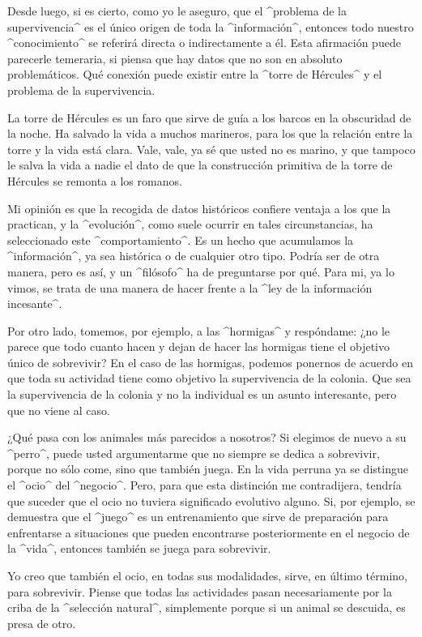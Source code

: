 Desde luego, si es cierto, como yo le aseguro, que el ^problema de la
supervivencia^ es el único origen de toda la ^información^, entonces
todo nuestro ^conocimiento^ se referirá directa o indirectamente a él.
Esta afirmación puede parecerle temeraria, si piensa que hay datos que
no son en absoluto problemáticos. Qué conexión puede existir entre la
^torre de Hércules^ y el problema de la supervivencia.

La torre de Hércules es un faro que sirve de guía a los barcos en la
obscuridad de la noche. Ha salvado la vida a muchos marineros, para los
que la relación entre la torre y la vida está clara. Vale, vale, ya sé
que usted no es marino, y que tampoco le salva la vida a nadie el dato
de que la construcción primitiva de la torre de Hércules se remonta a
los romanos.

Mi opinión es que la recogida de datos históricos confiere ventaja a los
que la practican, y la ^evolución^, como suele ocurrir en tales
circunstancias, ha seleccionado este ^comportamiento^. Es un hecho que
acumulamos la ^información^, ya sea histórica o de cualquier otro tipo.
Podría ser de otra manera, pero es así, y un ^filósofo^ ha de
preguntarse por qué. Para mi, ya lo vimos, se trata de una manera de
hacer frente a la ^ley de la información incesante^.

Por otro lado, tomemos, por ejemplo, a las ^hormigas^ y respóndame: ¿no
le parece que todo cuanto hacen y dejan de hacer las hormigas tiene el
objetivo único de sobrevivir? En el caso de las hormigas, podemos
ponernos de acuerdo en que toda su actividad tiene como objetivo la
supervivencia de la colonia. Que sea la supervivencia de la colonia y no
la individual es un asunto interesante, pero que no viene al caso.

¿Qué pasa con los animales más parecidos a nosotros? Si elegimos de
nuevo a su ^perro^, puede usted argumentarme que no siempre se dedica a
sobrevivir, porque no sólo come, sino que también juega. En la vida
perruna ya se distingue el ^ocio^ del ^negocio^. Pero, para que esta
distinción me contradijera, tendría que suceder que el ocio no tuviera
significado evolutivo alguno. Si, por ejemplo, se demuestra que el
^juego^ es un entrenamiento que sirve de preparación para enfrentarse a
situaciones que pueden encontrarse posteriormente en el negocio de la
^vida^, entonces también se juega para sobrevivir.

Yo creo que también el ocio, en todas sus modalidades, sirve, en último
término, para sobrevivir. Piense que todas las actividades pasan
necesariamente por la criba de la ^selección natural^, simplemente
porque si un animal se descuida, es presa de otro.


